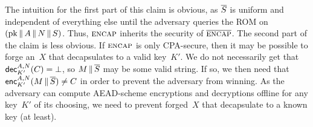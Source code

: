 The intuition for the first part of this claim is obvious, as $\overline{S}$ is uniform and independent of everything else until the adversary queries the ROM on $(\mathrm{pk} \,\|\, A \,\|\, N \,\|\, S)$.  Thus, $\textsc{encap}$ inherits the security of $\overline{\textsc{encap}}$.  The second part of the claim is less obvious.  If $\textsc{encap}$ is only CPA-secure, then it may be possible to forge an~$X$ that decapsulates to a valid key~$K'$.  We do not necessarily get that ${\mathsf{dec}}_{K'}^{A,N}(C)=\bot$, so $M \,\|\, \overline{S}$ may be some valid string.  If so, we then need that ${\mathsf{enc}}_{K'}^{A,N}(M \,\|\, \overline{S}) \neq C$ in order to prevent the adversary from winning.  As the adversary can compute AEAD-scheme encryptions and decryptions offline for any key~$K'$ of its choosing, we need to prevent forged~$X$ that decapsulate to a known key (at least).  

